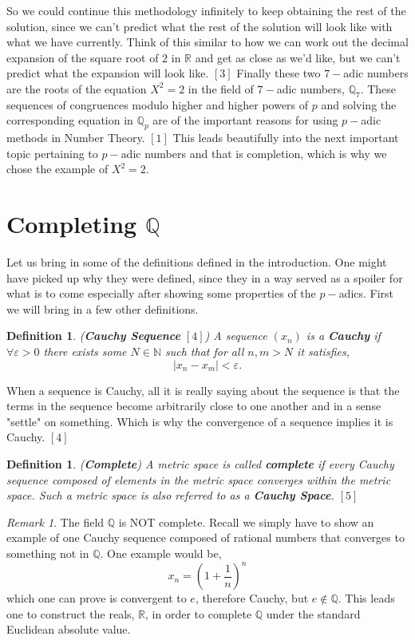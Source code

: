 \documentclass[12pt]{article}
\newtheorem{mydef}[thm]{Definition}
\theoremstyle{definition}
\theoremstyle{remark}
\newtheorem*{remark}{Remark}
\newcommand{\qq}{\mathbb Q}   %
\newcommand{\rr}{\mathbb R}   %
\newcommand{\nn}{\mathbb N}   %
\newcommand{\abs}[1]{\left\lvert#1\right\rvert} %
\renewcommand{\epsilon}{\varepsilon}
\newcommand{\lrp}[1]{\left(#1\right)}
\newcommand{\lrb}[1]{\left[#1\right]}
\begin{document}
  So we could continue this methodology infinitely to keep obtaining the rest of the solution, since we can't predict what the rest of the solution will look like with what we have currently. Think of this similar to how we can work out the decimal expansion of the square root of $2$ in $\rr$ and get as close as we'd like, but we can't predict what the expansion will look like. $\lrb{3}$ Finally these two $7-$adic numbers are the roots of the equation $X^{2} = 2$ in the field of $7-$adic numbers, $\qq_7$. These sequences of congruences modulo higher and higher powers of $p$ and solving the corresponding equation in $\qq_p$ are of the important reasons for using $p-$adic methods in Number Theory. $\lrb{1}$ This leads beautifully into the next important topic pertaining to $p-$adic numbers and that is completion, which is why we chose the example of $X^{2} = 2$.

\section{Completing $\qq$}
  Let us bring in some of the definitions defined in the introduction. One might have picked up why they were defined, since they in a way served as a spoiler for what is to come especially after showing some properties of the $p-$adics. First we will bring in a few other definitions. 
  \begin{mydef}(\textbf{Cauchy Sequence} $\lrb{4}$) A sequence $(x_n)$ is a \textbf{Cauchy} if $\forall \epsilon > 0$ there exists some $N \in \nn$ such that for all $n,m > N$ it satisfies,
    \[\abs{x_n - x_m} < \epsilon.\]
  \end{mydef} 
  When a sequence is Cauchy, all it is really saying about the sequence is that the terms in the sequence become arbitrarily close to one another and in a sense "settle" on something. Which is why the convergence of a sequence implies it is Cauchy. $\lrb{4}$

  \begin{mydef} (\textbf{Complete})
    A metric space is called \textbf{complete} if every Cauchy sequence composed of elements in the metric space converges within the metric space. Such a metric space is also referred to as a \textbf{Cauchy Space}. $\lrb{5}$
  \end{mydef}

  \begin{remark}
    The field $\qq$ is NOT complete. Recall we simply have to show an example of one Cauchy sequence composed of rational numbers that converges to something not in $\qq$. One example would be,
    \[x_n = \lrp{1 + \dfrac{1}{n}}^{n}\]
    which one can prove is convergent to $e$, therefore Cauchy, but $e \notin \qq$. This leads one to construct the reals, $\rr$, in order to complete $\qq$ under the standard Euclidean absolute value. 
  \end{remark}
\end{document}
